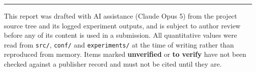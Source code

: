 \documentclass[11pt,a4paper]{article}
\newcommand{\code}[1]{\texttt{\small #1}}
\begin{document}
\vspace{1em}
\noindent\rule{\linewidth}{0.4pt}
\vspace{0.3em}

\noindent\footnotesize\color{Gray60}
This report was drafted with AI assistance (Claude Opus 5) from the project source tree and
its logged experiment outputs, and is subject to author review before any of its content is
used in a submission. All quantitative values were read from \code{src/}, \code{conf/} and
\code{experiments/} at the time of writing rather than reproduced from memory. Items marked
\textbf{unverified} or \textbf{to verify} have not been checked against a publisher record
and must not be cited until they are.
\end{document}
